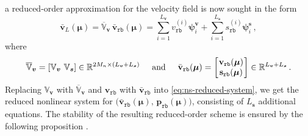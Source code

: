 \documentclass[12pt, a4paper, twoside, openright, notitlepage]{report}
\numberwithin{equation}{chapter}
\theoremstyle{theorem}
\theoremstyle{definition}
\theoremstyle{remark}
\theoremstyle{proposition}
\numberwithin{figure}{chapter}
\newcommand{\bg}[1]{\boldsymbol{#1}}
\begin{document}
		a reduced-order approximation for the velocity field is now sought in the form
		\begin{equation*}
			\bar{\mathbf{v}}_L(\bg{\mu}) = \overline{\mathbb{V}}_{\bg{v}} \, \bar{\mathbf{v}}_{\texttt{rb}}(\bg{\mu}) = \sum_{i = 1}^{L_{\bg{v}}} v_{\texttt{rb}}^{(i)} \bg{\psi}_i^{\bg{v}} + \sum_{i = 1}^{L_{\bg{s}}} s_{\texttt{rb}}^{(i)} \bg{\psi}_i^{\bg{s}} \, ,
		\end{equation*} 
		where
		\begin{equation*}
			\overline{\mathbb{V}}_{\bg{v}} = \left[ \mathbb{V}_{\bg{v}} ~ \mathbb{V}_{\bg{s}} \right] \in \mathbb{R}^{2 M_n \times (L_{\bg{v}} + L_{\bg{s}})} \hspace*{0.5cm} \text{and} \hspace*{0.5cm} \bar{\mathbf{v}}_{\texttt{rb}}(\bg{\mu}) =
			\begin{bmatrix}
			\hspace*{-0.15cm}
			\begin{array}{c}
				\mathbf{v}_{\texttt{rb}}(\bg{\mu}) \\
				\mathbf{s}_{\texttt{rb}}(\bg{\mu})
			\end{array} 
			\hspace*{-0.15cm}
			\end{bmatrix} 
			\in \mathbb{R}^{L_{\bg{v}} + L_{\bg{s}}} \, .
		\end{equation*}
		Replacing $\mathbb{V}_{\bg{v}}$ with $\overline{\mathbb{V}}_{\bg{v}}$ and $\mathbf{v}_{\texttt{rb}}$ with $\bar{\mathbf{v}}_{\texttt{rb}}$ into \eqref{eq:ns-reduced-system}, we get the reduced nonlinear system for $\big( \bar{\mathbf{v}}_{\texttt{rb}}(\bg{\mu}), \, \mathbf{p}_{\texttt{rb}}(\bg{\mu}) \big)$, consisting of $L_{\bg{s}}$ additional equations. The stability of the resulting reduced-order scheme is ensured by the following proposition \cite{Bal14}. 
		
\end{document}
